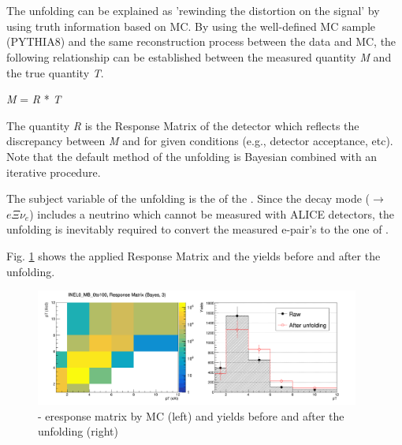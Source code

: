 \paragraph{}\mbox{}\\[1pt]
The unfolding can be explained as 'rewinding the distortion on the signal' by using truth information based on MC. By using the well-defined MC sample (PYTHIA8) and the same reconstruction process between the data and MC, the following relationship can be established between the measured quantity \textit{M} and the true quantity \textit{T}.

\vspace{\columnsep}
\centerline{\textit{M} = \textit{R} * \textit{T}}

The quantity \textit{R} is the Response Matrix of the detector which reflects the discrepancy between \textit{M} and  for given conditions (e.g., detector acceptance, etc). Note that the default method of the unfolding is Bayesian combined with an iterative procedure.

The subject variable of the unfolding is the \pt of the \Xic. Since the decay mode (\Xic $\rightarrow$ $e\Xi\nu_{e}$) includes a neutrino which cannot be measured with ALICE detectors, the unfolding is inevitably required to convert the measured e-\Xim pair's \pt to the one of \Xic.

Fig. \ref{fig:s2_unfolding} shows the applied Response Matrix and the yields before and after the unfolding.

\vspace{\columnsep}
\begin{figure}[h]
    \centering
    \includegraphics[width=0.95\textwidth]{plots/s2_unfold_INEL0_MB_0to100.png}
    \caption{\Xic - e\Xim response matrix by MC (left) and yields before and after the unfolding (right)}
    \label{fig:s2_unfolding}
\end{figure}

\clearpage

\vspace{\columnsep}

